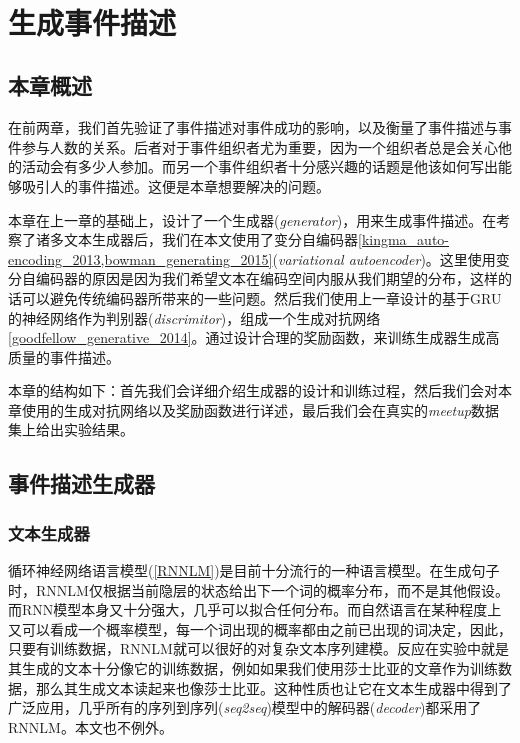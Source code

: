 \documentclass[]{template}
\begin{document}
~
\section{生成事件描述}
\subsection{本章概述}
在前两章，我们首先验证了事件描述对事件成功的影响，以及衡量了事件描述与事件参与人数的关系。后者对于事件组织者尤为重要，因为一个组织者总是会关心他的活动会有多少人参加。而另一个事件组织者十分感兴趣的话题是他该如何写出能够吸引人的事件描述。这便是本章想要解决的问题。

本章在上一章的基础上，设计了一个生成器(\textit{generator})，用来生成事件描述。在考察了诸多文本生成器后，我们在本文使用了变分自编码器\ref{kingma_auto-encoding_2013,bowman_generating_2015}(\textit{variational autoencoder})。这里使用变分自编码器的原因是因为我们希望文本在编码空间内服从我们期望的分布，这样的话可以避免传统编码器所带来的一些问题。然后我们使用上一章设计的基于GRU的神经网络作为判别器(\textit{discrimitor})，组成一个生成对抗网络\ref{goodfellow_generative_2014}。通过设计合理的奖励函数，来训练生成器生成高质量的事件描述。

本章的结构如下：首先我们会详细介绍生成器的设计和训练过程，然后我们会对本章使用的生成对抗网络以及奖励函数进行详述，最后我们会在真实的\textit{meetup}数据集上给出实验结果。

\subsection{事件描述生成器}
\subsubsection{文本生成器}
循环神经网络语言模型(\ref{RNNLM})是目前十分流行的一种语言模型。在生成句子时，RNNLM仅根据当前隐层的状态给出下一个词的概率分布，而不是其他假设。而RNN模型本身又十分强大，几乎可以拟合任何分布。而自然语言在某种程度上又可以看成一个概率模型，每一个词出现的概率都由之前已出现的词决定，因此，只要有训练数据，RNNLM就可以很好的对复杂文本序列建模。反应在实验中就是其生成的文本十分像它的训练数据，例如如果我们使用莎士比亚的文章作为训练数据，那么其生成文本读起来也像莎士比亚。这种性质也让它在文本生成器中得到了广泛应用，几乎所有的序列到序列(\textit{seq2seq})模型中的解码器(\textit{decoder})都采用了RNNLM。本文也不例外。
\end{document}
